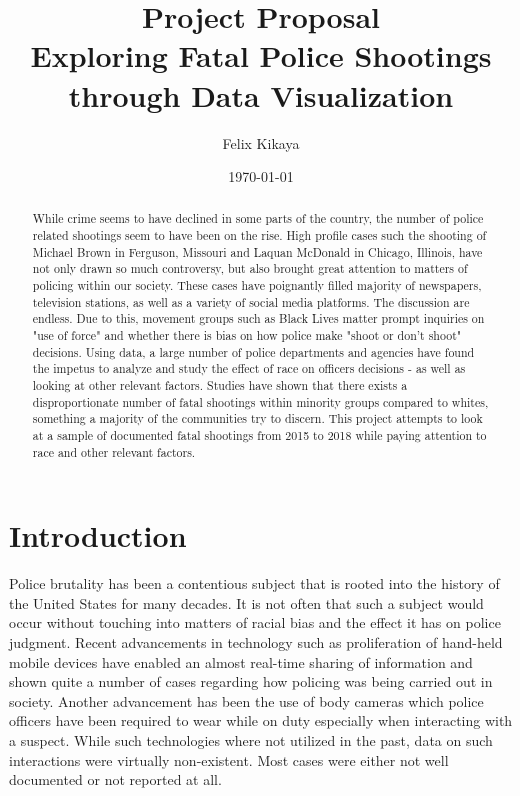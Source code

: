 \documentclass[a4paper,12pt]{article}
\title{\textbf{Project Proposal\\
\large{Exploring Fatal Police Shootings through Data Visualization}
}}
\author{Felix Kikaya}
\date{\today}
\begin{document}
\maketitle

\begin{abstract}
While crime seems to have declined in some parts of the country, the number of police related shootings seem to have been on the rise. High profile cases such the shooting of \cite{ferguson} Michael Brown in Ferguson, Missouri and Laquan McDonald in Chicago, Illinois, have not only drawn so much controversy, but also brought great attention to matters of policing within our society. These cases have poignantly filled majority of newspapers, television stations, as well as a variety of social media platforms. The discussion are endless. Due to this, movement groups such as Black Lives matter prompt inquiries on "use of force" and whether there is bias on how police make "shoot or don't shoot" decisions. Using data, a large number of police departments and agencies have found the impetus to analyze and study the effect of race on officers decisions - as well as looking at other relevant factors. Studies have shown that there exists a disproportionate number of fatal shootings within minority groups compared to whites, something a majority of the communities try to discern. This project attempts to look at a sample of documented fatal shootings from 2015 to 2018 while paying attention to race and other relevant factors. 
\end{abstract}
\section*{Introduction}

Police brutality has been a contentious subject that is rooted into the history of the United States for many decades. It is not often that such a subject would occur without touching into matters of racial bias and the effect it has on police judgment. Recent advancements in technology such as proliferation of hand-held mobile devices have enabled an almost real-time sharing of information and shown quite a number of cases regarding how policing was being carried out in society. Another advancement has been the use of body cameras which police officers have been required to wear while on duty especially when interacting with a suspect. While such technologies where not utilized in the past, data on such interactions were virtually non-existent. Most cases were either not well documented or not reported at all. 
 
\end{document}
